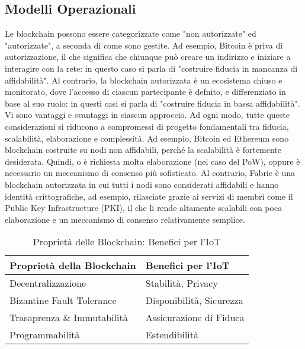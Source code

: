 \subsection{Modelli Operazionali}
Le blockchain possono essere categorizzate come "non autorizzate" ed "autorizzate", a seconda di come sono gestite. Ad esempio, Bitcoin è priva di autorizzazione, il che significa che chiunque può creare un indirizzo e iniziare a interagire con la rete: in questo caso si parla di "costruire fiducia in mancanza di affidabilità". Al contrario, la blockchain autorizzata è un ecosistema chiuso e monitorato, dove l'accesso di ciascun partecipante è defnito, e differenziato in base al suo ruolo: in questi casi si parla di "costruire fiducia in bassa affidabilità".
Vi sono vantaggi e svantaggi in ciascun approccio. Ad ogni modo, tutte queste considerazioni si riducono a compromessi di progetto fondamentali tra fiducia, scalabilità, elaborazione e complessità. Ad esempio, Bitcoin ed Ethereum sono blockchain costruite su nodi non affidabili, perché la scalabilità è fortemente desiderata. Quindi, o è richiesta molta elaborazione (nel caso del PoW), oppure è necessario un meccanismo di consenso più sofisticato. Al contrario, Fabric \cite{c14} è una blockchain autorizzata in cui tutti i nodi sono considerati affidabili e hanno identità crittografiche, ad esempio, rilasciate grazie ai servizi di membri come il Public Key Infrastructure (PKI), il che li rende altamente scalabili con poca elaborazione e un meccanismo di consenso relativamente semplice.

\begin{table}[tp]%
	\caption{Proprietà delle Blockchain: Benefici per l'IoT}
	\label{table:BlockchainBenefits}\centering %
	\begin{tabular}{l|l}
		\hline
		Proprietà della Blockchain  & Benefici per l'IoT       \\
		\hline
		Decentralizzazione          & Stabilità, Privacy       \\
		Bizantine Fault Tolerance   & Disponibilità, Sicurezza \\
		Trasaprenza \& Immutabilità & Assicurazione di Fiduca  \\
		Programmabilità             & Estendibilità            \\
		\hline
	\end{tabular}
\end{table}
